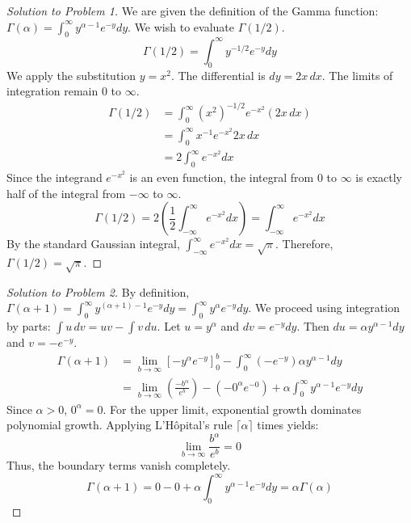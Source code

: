 \documentclass[11pt, a4paper]{article}
\theoremstyle{definition}
\theoremstyle{remark}
\begin{document}
\begin{proof}[Solution to Problem 1]
We are given the definition of the Gamma function: $\Gamma(\alpha) = \int_0^\infty y^{\alpha-1} e^{-y} dy$. We wish to evaluate $\Gamma(1/2)$.
\[ \Gamma(1/2) = \int_0^\infty y^{-1/2} e^{-y} dy \]
We apply the substitution $y = x^2$. The differential is $dy = 2x \, dx$. The limits of integration remain $0$ to $\infty$.
\begin{align*}
\Gamma(1/2) &= \int_0^\infty (x^2)^{-1/2} e^{-x^2} (2x \, dx) \\
&= \int_0^\infty x^{-1} e^{-x^2} 2x \, dx \\
&= 2 \int_0^\infty e^{-x^2} dx
\end{align*}
Since the integrand $e^{-x^2}$ is an even function, the integral from $0$ to $\infty$ is exactly half of the integral from $-\infty$ to $\infty$.
\[ \Gamma(1/2) = 2 \left( \frac{1}{2} \int_{-\infty}^\infty e^{-x^2} dx \right) = \int_{-\infty}^\infty e^{-x^2} dx \]
By the standard Gaussian integral, $\int_{-\infty}^\infty e^{-x^2} dx = \sqrt{\pi}$. Therefore, $\Gamma(1/2) = \sqrt{\pi}$.
\end{proof}

\begin{proof}[Solution to Problem 2]
By definition, $\Gamma(\alpha + 1) = \int_0^\infty y^{(\alpha+1)-1} e^{-y} dy = \int_0^\infty y^\alpha e^{-y} dy$.
We proceed using integration by parts: $\int u \, dv = uv - \int v \, du$.
Let $u = y^\alpha$ and $dv = e^{-y} dy$.
Then $du = \alpha y^{\alpha-1} dy$ and $v = -e^{-y}$.
\begin{align*}
\Gamma(\alpha + 1) &= \lim_{b \to \infty} \left[ -y^\alpha e^{-y} \right]_0^b - \int_0^\infty (-e^{-y}) \alpha y^{\alpha-1} dy \\
&= \lim_{b \to \infty} \left( \frac{-b^\alpha}{e^b} \right) - \left( -0^\alpha e^{-0} \right) + \alpha \int_0^\infty y^{\alpha-1} e^{-y} dy
\end{align*}
Since $\alpha > 0$, $0^\alpha = 0$. For the upper limit, exponential growth dominates polynomial growth. Applying L'H\^{o}pital's rule $\lceil \alpha \rceil$ times yields:
\[ \lim_{b \to \infty} \frac{b^\alpha}{e^b} = 0 \]
Thus, the boundary terms vanish completely.
\[ \Gamma(\alpha + 1) = 0 - 0 + \alpha \int_0^\infty y^{\alpha-1} e^{-y} dy = \alpha \Gamma(\alpha) \]
\end{proof}
\end{document}
